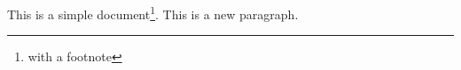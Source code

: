 \documentclass[a4paper,12pt]{article}
\begin{document}
This is a simple document\footnote{with a footnote}.
This is a new paragraph.
\end{document}
